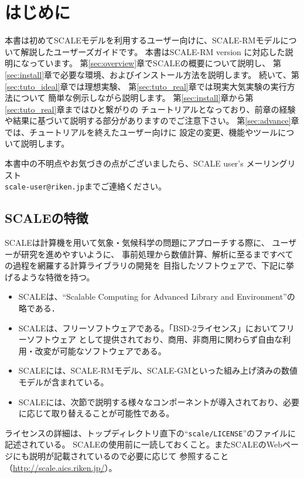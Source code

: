 \section{はじめに}

本書は初めてSCALEモデルを利用するユーザー向けに、SCALE-RMモデルについて解説したユーザーズガイドです。
本書はSCALE-RM version \version に対応した説明になっています。
第\ref{sec:overview}章でSCALEの概要について説明し、
第\ref{sec:install}章で必要な環境、およびインストール方法を説明します。
%
続いて、第\ref{sec:tuto_ideal}章では理想実験、
第\ref{sec:tuto_real}章では現実大気実験の実行方法について
簡単な例示しながら説明します。
第\ref{sec:install}章から第\ref{sec:tuto_real}章まではひと繋がりの
チュートリアルとなっており、前章の経験や結果に基づいて説明する部分がありますのでご注意下さい。
%
第\ref{sec:advance}章では、チュートリアルを終えたユーザー向けに
設定の変更、機能やツールについて説明します。

本書中の不明点やお気づきの点がございましたら、SCALE user's メーリングリスト\\
 \verb|scale-user@riken.jp|までご連絡ください。



\subsection{SCALEの特徴}
SCALEは計算機を用いて気象・気候科学の問題にアプローチする際に、
ユーザーが研究を進めやすいように、
事前処理から数値計算、解析に至るまですべての過程を網羅する計算ライブラリの開発を
目指したソフトウェアで、下記に挙げるような特徴を持つ。
\begin{itemize}
\item SCALEは、``Scalable Computing for Advanced Library and Environment''の略である．
\item SCALEは、フリーソフトウェアである。「BSD-2ライセンス」においてフリーソフトウェア
として提供されており、商用、非商用に関わらず自由な利用・改変が可能なソフトウェアである。
\item SCALEには、SCALE-RMモデル、SCALE-GMといった組み上げ済みの数値モデルが含まれている。
\item SCALEには、次節で説明する様々なコンポーネントが導入されており、必要に応じて取り替えることが可能性である。
\end{itemize}

ライセンスの詳細は、トップディレクトリ直下の``\verb|scale/LICENSE|''のファイルに記述されている。
SCALEの使用前に一読しておくこと。またSCALEのWebページにも説明が記載されているので必要に応じて
参照すること（\url{http://scale.aics.riken.jp/}）。

